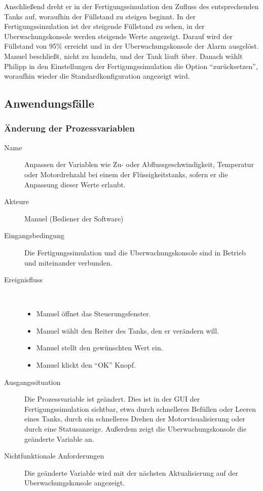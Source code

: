 \documentclass[parskip=full]{scrartcl}
\begin{document}
Anschlie{\ss}end dreht er in der \gls{Fertigungssimulation} den Zufluss des entsprechenden Tanks auf, woraufhin der F\"ullstand
zu steigen beginnt. In der \gls{Fertigungssimulation} ist der steigende F\"ullstand zu sehen, in der \gls{Uberwachungskonsole} werden
steigende Werte angezeigt.
Darauf wird der F\"ullstand von 95\% erreicht und in der \gls{Uberwachungskonsole} der Alarm ausgel\"ost. Manuel
beschlie{\ss}t, nicht zu handeln, und der Tank l\"auft \"uber. Danach w\"ahlt Philipp in den Einstellungen der
\gls{Fertigungssimulation} die Option "`zur\"ucksetzen"', woraufhin wieder die Standardkonfiguration angezeigt wird.

\subsection{Anwendungsfälle}
\subsubsection{Änderung der Prozessvariablen}
\begin{description}
  \item[Name] Anpassen der Variablen wie Zu- oder Abflussgeschwindigkeit, Temperatur oder Motordrehzahl bei einem der
  Flüssigkeitstanks, sofern er die Anpassung dieser Werte erlaubt.
  \item[Akteure] Manuel (Bediener der Software)
  \item[Eingangsbedingung] Die \gls{Fertigungssimulation} und die \gls{Uberwachungskonsole} sind in Betrieb und miteinander verbunden.
  \item[Ereignisfluss]~\\
\begin{itemize}[noitemsep]
  \item Manuel öffnet das Steuerungsfenster.
  \item Manuel wählt den Reiter des Tanks, den er verändern will.
  \item Manuel stellt den gewünschten Wert ein.
  \item Manuel klickt den "`OK"' Knopf.
\end{itemize}
  \item[Ausgangssituation] Die Prozessvariable ist geändert. Dies ist in der GUI der Fertigungssimulation sichtbar, etwa durch schnelleres Befüllen oder Leeren eines Tanks,
  durch ein schnelleres Drehen der Motorvisualisierung oder durch eine Statusanzeige.
    Außerdem zeigt die \gls{Uberwachungskonsole} die geänderte Variable an.
  \item [Nichtfunktionale Anforderungen] Die geänderte Variable wird mit der nächsten Aktualisierung auf der \gls{Uberwachungskonsole} angezeigt.
\end{description}
\end{document}
